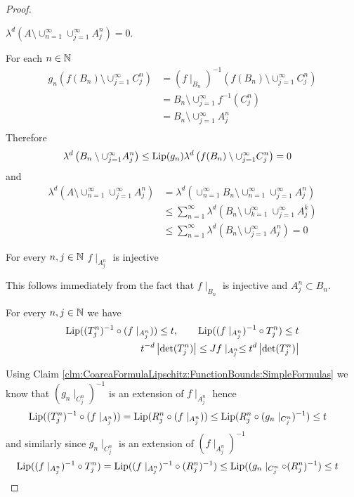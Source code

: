 \begin{proof}
\begin{clm} $\lambda^d\left( A \setminus \cup_{n=1}^\infty \cup_{j=1}^\infty A^n_j \right) = 0$.
\end{clm}
For each $n \in \mathbb{N}$
\begin{align*}
g_n \left(f(B_n) \setminus \cup_{j=1}^\infty C^n_j \right) 
&= (f \mid_{B_n})^{-1} \left(f(B_n) \setminus \cup_{j=1}^\infty C^n_j \right) \\
&=B_n \setminus \cup_{j=1}^\infty f^{-1}(C^n_j) \\
&=B_n \setminus \cup_{j=1}^\infty A^n_j \\
\end{align*}
Therefore
\begin{align*}
\lambda^d\left(B_n \setminus \cup_{j=1}^\infty A^n_j  \right) 
&\leq \operatorname*{Lip}(g_n) \lambda^d \left( f(B_n) \setminus \cup_{j=1}^\infty C^n_j \right) = 0
\end{align*}
and
\begin{align*}
\lambda^d\left( A \setminus \cup_{n=1}^\infty \cup_{j=1}^\infty A^n_j \right)
&= \lambda^d \left( \cup_{n=1}^\infty B_n \setminus \cup_{n=1}^\infty \cup_{j=1}^\infty A^n_j \right) \\
&\leq \sum_{n=1}^\infty \lambda^d \left(B_n \setminus \cup_{k=1}^\infty \cup_{j=1}^\infty A^k_j \right) \\
&\leq \sum_{n=1}^\infty \lambda^d \left(B_n \setminus \cup_{j=1}^\infty A^n_j \right) = 0
\end{align*}

\begin{clm} For every $n,j \in \mathbb{N}$ $f \mid_{A^n_j}$ is injective
\end{clm}
This follows immediately from the fact that $f \mid_{B_n}$ is injective and $A^n_j \subset B_n$.

\begin{clm} For every $n,j \in \mathbb{N}$ we have
\begin{align*}
\operatorname*{Lip}( (T^n_j)^{-1} \circ (f \mid_{A^n_j})) \leq t, \qquad \operatorname*{Lip}((f  \mid_{A^n_j})^{-1} \circ T^n_j) \leq t \\
t^{-d} \left \vert \det(T^n_j) \right \vert \leq Jf\mid_{A^n_j} \leq t^{d} \left \vert \det(T^n_j) \right \vert 
\end{align*}
\end{clm}
Using Claim \ref{clm:CoareaFormulaLipschitz:FunctionBounds:SimpleFormulas} we know that $(g_n \mid_{C^n_j})^{-1}$ is an
extension of $f \mid_{A^n_j}$ hence
\begin{align*}
\operatorname*{Lip}((T^n_j)^{-1} \circ (f \mid_{A^n_j})) &= \operatorname*{Lip}(R^n_j \circ (f \mid_{A^n_j})) \leq \operatorname*{Lip}(R^n_j \circ (g_n \mid_{C^n_j})^{-1}) \leq t
\end{align*}
and similarly since $g_n \mid_{C^n_j}$ is an extension of $(f \mid_{A^n_j})^{-1}$ 
\begin{align*}
\operatorname*{Lip}((f \mid_{A^n_j})^{-1} \circ T^n_j) &= \operatorname*{Lip}((f \mid_{A^n_j})^{-1} \circ (R^n_j)^{-1}) \leq \operatorname*{Lip}((g_n \mid_{C^n_j} \circ (R^n_j)^{-1}) \leq t
\end{align*}


\end{proof}
